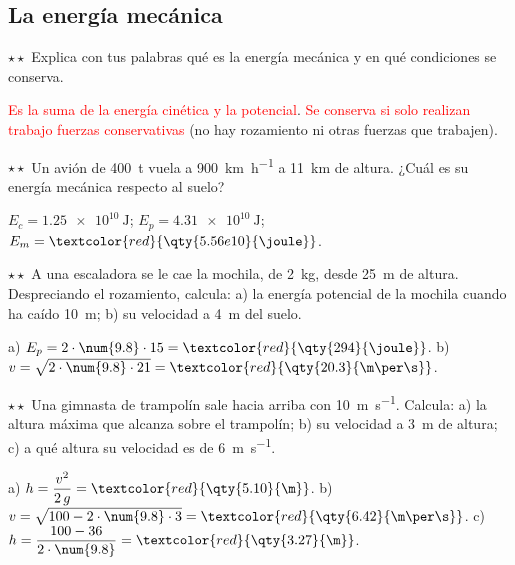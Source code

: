 \subsection{La energía mecánica}

\begin{exercise}
    \(\star\star\) Explica con tus palabras qué es la energía mecánica y en qué condiciones se conserva.
    \begin{solu}
        \textcolor{red}{Es la suma de la energía cinética y la potencial}. \textcolor{red}{Se conserva si solo realizan trabajo fuerzas
        conservativas} (no hay rozamiento ni otras fuerzas que trabajen).
    \end{solu}
\end{exercise}

\begin{exercise}
    \(\star\star\) Un avión de \qty{400}{t} vuela a \qty{900}{\km\per\hour} a \qty{11}{\km} de altura. ¿Cuál es su energía mecánica
    respecto al suelo?
    \begin{solu}
        \(E_c = \qty{1.25e10}{\joule}\); \(E_p = \qty{4.31e10}{\joule}\); \(E_m = \textcolor{red}{\qty{5.56e10}{\joule}}\).
    \end{solu}
\end{exercise}

\begin{exercise}
    \(\star\star\) A una escaladora se le cae la mochila, de \qty{2}{\kg}, desde \qty{25}{\m} de altura. Despreciando el rozamiento,
    calcula: a) la energía potencial de la mochila cuando ha caído \qty{10}{\m}; b) su velocidad a \qty{4}{\m} del suelo.
    \begin{solu}
        a) \(E_p = 2 \cdot \num{9.8} \cdot 15 = \textcolor{red}{\qty{294}{\joule}}\). b) \(v = \sqrt{2 \cdot \num{9.8} \cdot 21} =
        \textcolor{red}{\qty{20.3}{\m\per\s}}\).
    \end{solu}
\end{exercise}

\begin{exercise}
    \(\star\star\) Una gimnasta de trampolín sale hacia arriba con \qty{10}{\m\per\s}. Calcula: a) la altura máxima que alcanza sobre
    el trampolín; b) su velocidad a \qty{3}{\m} de altura; c) a qué altura su velocidad es de \qty{6}{\m\per\s}.
    \begin{solu}
        a) \(h = \dfrac{v^2}{2\,g} = \textcolor{red}{\qty{5.10}{\m}}\). b) \(v = \sqrt{100 - 2 \cdot \num{9.8} \cdot 3} = \textcolor{red}{\qty{6.42}{\m\per\s}}\).
        c) \(h = \dfrac{100 - 36}{2 \cdot \num{9.8}} = \textcolor{red}{\qty{3.27}{\m}}\).
    \end{solu}
\end{exercise}

